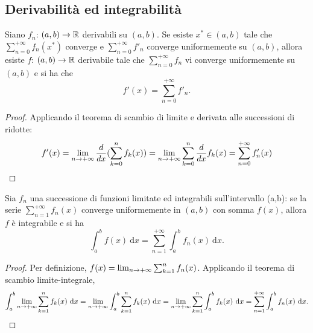 \documentclass[Completo.tex]{subfiles}
\begin{document}
\subsection{Derivabilità ed integrabilità}
\begin{eTh}
	Siano $f_n$: $(a,b) \ra \bb[R]$ derivabili su $(a,b)$. Se esiste $x^{*} \in (a,b)$ tale che $\sum_{n=0}^{+\infty} f_n(x^{*})$ converge e $\sum_{n=0}^{+\infty} f'_n$ converge uniformemente su $(a,b)$, allora esiste $f$: $(a,b) \ra \bb[R]$ derivabile tale che $\sum_{n=0}^{+\infty} f_n$ vi converge uniformemente su $(a,b)$ e si ha che
	\begin{equation*}
		f'(x) = \sum\limits_{n=0}^{+\infty} f'_n.
	\end{equation*}
\end{eTh}
\begin{proof}
	Applicando il teorema di scambio di limite e derivata alle successioni di ridotte:
	\begin{equation*}
	f'(x) = \lim\limits_{n \rightarrow +\infty} \frac{d}{dx}(\sum\limits_{k=0}^{n} f_k(x)) = \lim\limits_{n \rightarrow +\infty} \sum\limits_{k=0}^{n} \frac{d}{dx}f_k(x) = \sum\limits_{n=0}^{+\infty} f'_n(x)
	\end{equation*}
\end{proof}
\begin{eTh}
	Sia $f_n$ una successione di funzioni limitate ed integrabili sull'intervallo (a,b): se la serie $\sum_{n=1}^{+\infty} f_n(x)$ converge uniformemente in $(a,b)$ con somma $f(x)$, allora $f$ è integrabile e si ha
	\begin{equation*}
	\int_{a}^{b} f(x) \ \mathrm{d}x = \sum_{n=1}^{+\infty} \int_{a}^{b} f_n(x) \ \mathrm{d}x.
	\end{equation*}
\end{eTh}
\begin{proof}
	Per definizione, $f(x) = \lim_{n \rightarrow +\infty} \sum_{k=1}^{n} f_n(x)$. Applicando il teorema di scambio limite-integrale,
	\begin{equation*}
	\int_{a}^{b} \lim_{n \ra +\infty} \sum_{k=1}^{n} f_k(x) \ \mathrm{d}x = \lim_{n \ra +\infty} \int_{a}^{b} \sum_{k=1}^{n} f_k(x) \ \mathrm{d}x = \lim_{n \ra +\infty} \sum_{k=1}^{n} \int_{a}^{b} f_k(x) \ \mathrm{d}x = \sum_{n=1}^{+\infty} \int_{a}^{b} f_n(x) \ \mathrm{d}x.
	\end{equation*}
\end{proof}
\end{document}
